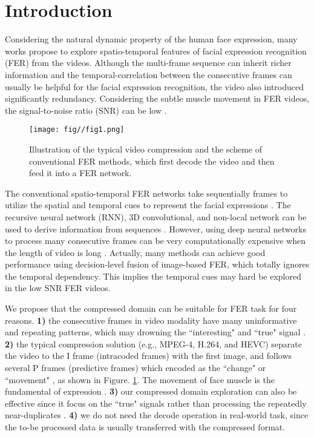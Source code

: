\documentclass[a4paper,conference]{IEEEtran}
\begin{document}
\IEEEpeerreviewmaketitle


\section{Introduction}


Considering the natural dynamic property of the human face expression, many works propose to explore spatio-temporal features of facial expression recognition (FER) from the videos. Although the multi-frame sequence can inherit richer information and the temporal-correlation between the consecutive frames can usually be helpful for the facial expression recognition, the video also introduced significantly redundancy. Considering the subtle muscle movement in FER videos, the signal-to-noise ratio (SNR) can be low \cite{liu2019hard,li2020deep}.

\begin{figure}[t]
\centering
\texttt{[image: fig//fig1.png]}\\
\caption{Illustration of the typical video compression and the scheme of conventional FER methods, which first decode the video and then feed it into a FER network.}\label{fig:1}
\end{figure}

The conventional spatio-temporal FER networks take sequentially frames to utilize the spatial and temporal cues to represent the facial expressions \cite{li2020deep}. The recursive neural network (RNN), 3D convolutional, and non-local network can be used to derive information from sequences \cite{kim2017multi,tran2015learning,meng2019frame}. However, using deep neural networks to process many consecutive frames can be very computationally expensive when the length of video is long \cite{liu2018dependency,liu2019attention,liu2019permutation,liu2019dependency}. Actually, many methods can achieve good performance using decision-level fusion of image-based FER, which totally ignores the temporal dependency. This implies the temporal cues may hard be explored in the low SNR FER videos.    


We propose that the compressed domain can be suitable for FER task for four reasons. \textbf{1)} the consecutive frames in video modality have many uninformative and repeating patterns, which may drowning the ``interesting" and ``true" signal \cite{yeo2006compressed}. \textbf{2)} the typical compression solution (e.g., MPEG-4, H.264, and HEVC) separate the video to the I frame (intracoded frames) with the first image, and follows several P frames (predictive frames) which encoded as the ``change" or ``movement" \cite{le1991mpeg}, as shown in Figure. \ref{fig:1}. The movement of face muscle is the fundamental of expression \cite{lucey2010extended}. \textbf{3)} our compressed domain exploration can also be effective since it focus on the ``true" signals rather than processing the repeatedly near-duplicates \cite{wu2018compressed,shou2019dmc}. \textbf{4)} we do not need the decode operation in real-world task, since the to-be processed data is usually transferred with the compressed format. 
\end{document}
